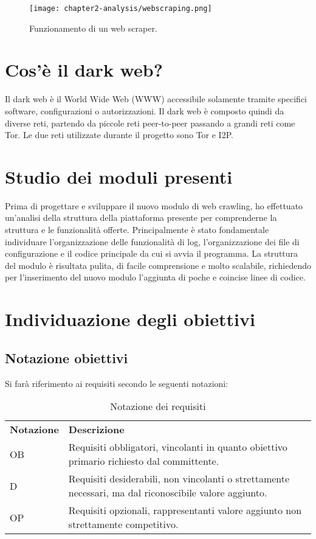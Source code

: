 \begin{figure}[!h] 
    \centering 
    \texttt{[image: chapter2-analysis/webscraping.png]} 
    \caption{Funzionamento di un web scraper.}
\end{figure}

\section{Cos'è il dark web?}
Il dark web è il World Wide Web (WWW) accessibile solamente tramite specifici software, configurazioni o autorizzazioni. Il dark web è composto quindi da diverse reti, partendo da piccole reti peer-to-peer passando a grandi reti come Tor.
Le due reti utilizzate durante il progetto sono Tor e I2P.
\section{Studio dei moduli presenti}

Prima di progettare e sviluppare il nuovo modulo di web crawling, ho effettuato un’analisi della struttura della piattaforma presente per comprenderne la struttura e le funzionalità offerte. Principalmente è stato fondamentale individuare l'organizzazione delle funzionalità di log, l'organizzazione dei file di configurazione e il codice principale da cui si avvia il programma. La struttura del modulo è risultata pulita, di facile comprensione e molto scalabile, richiedendo per l'inserimento del nuovo modulo l'aggiunta di poche e coincise linee di codice.


\section{Individuazione degli obiettivi}

\subsection{Notazione obiettivi}
Si farà riferimento ai requisiti secondo le seguenti notazioni:
\begin{longtable}{|p{}|p{}|}
	\caption{Notazione dei requisiti}
	\label{tab:notazione-requisiti} \\
	\hline
    \textbf{Notazione}	&	\textbf{Descrizione} \\
    OB			&	Requisiti obbligatori, vincolanti in quanto obiettivo primario richiesto dal committente. \\  
	\hline
    D			&	Requisiti desiderabili, non vincolanti o strettamente necessari, ma dal riconoscibile valore aggiunto. \\ 
	\hline
    OP			&	Requisiti opzionali, rappresentanti valore aggiunto non strettamente competitivo. \\
    \hline
\end{longtable}%


